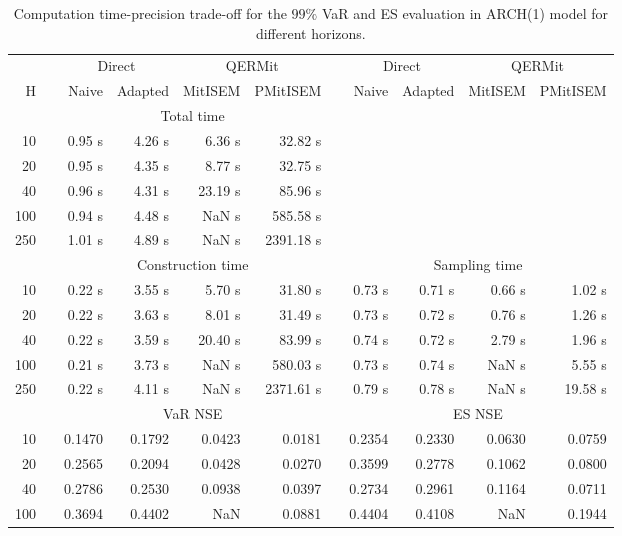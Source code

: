 { \renewcommand{\arraystretch}{1.3} 
\begin{table}[h] 
\centering 
\caption{Computation time-precision trade-off for the  $99\%$ VaR and ES evaluation in ARCH(1) model for different horizons.} 
\label{tab:time_precision_arch} 
\begin{tabular}{rr rrrr r rrrr}  
 & & \multicolumn{2}{c}{Direct} & \multicolumn{2}{c}{QERMit}&  & \multicolumn{2}{c}{Direct} & \multicolumn{2}{c}{QERMit} \\ \cline{3-6} \cline{8-11} 
 H & & Naive & Adapted & MitISEM & PMitISEM & & Naive & Adapted & MitISEM & PMitISEM \\ \hline 
 & & \multicolumn{4}{c}{Total time}  \\ \cline{3-6} 
10 & & 0.95 s & 4.26 s & 6.36 s & 32.82 s \\ 
20 & & 0.95 s & 4.35 s & 8.77 s & 32.75 s \\ 
40 & & 0.96 s & 4.31 s & 23.19 s & 85.96 s \\ 
100 & & 0.94 s & 4.48 s &  NaN s & 585.58 s \\ 
250 & & 1.01 s & 4.89 s &  NaN s & 2391.18 s \\ 
\hline 
 & & \multicolumn{4}{c}{Construction time} & & \multicolumn{4}{c}{ Sampling time} \\ \cline{3-6}  \cline{8-11}
10 & & 0.22 s & 3.55 s & 5.70 s & 31.80 s && 0.73 s & 0.71 s & 0.66 s & 1.02 s \\ 
20 & & 0.22 s & 3.63 s & 8.01 s & 31.49 s && 0.73 s & 0.72 s & 0.76 s & 1.26 s \\ 
40 & & 0.22 s & 3.59 s & 20.40 s & 83.99 s && 0.74 s & 0.72 s & 2.79 s & 1.96 s \\ 
100 & & 0.21 s & 3.73 s &  NaN s & 580.03 s && 0.73 s & 0.74 s &  NaN s & 5.55 s \\ 
250 & & 0.22 s & 4.11 s &  NaN s & 2371.61 s && 0.79 s & 0.78 s &  NaN s & 19.58 s \\ 
\hline 
 & & \multicolumn{4}{c}{VaR NSE} &&  \multicolumn{4}{c}{ES NSE} \\ \cline{3-6}  \cline{8-11}
10 && 0.1470  & 0.1792  & 0.0423 & 0.0181 && 0.2354  & 0.2330  & 0.0630 & 0.0759 \\ 
20 && 0.2565  & 0.2094  & 0.0428 & 0.0270 && 0.3599  & 0.2778  & 0.1062 & 0.0800 \\ 
40 && 0.2786  & 0.2530  & 0.0938 & 0.0397 && 0.2734  & 0.2961  & 0.1164 & 0.0711 \\ 
100 && 0.3694  & 0.4402  &    NaN & 0.0881 && 0.4404  & 0.4108  &    NaN & 0.1944 \\ 

\end{tabular}
\end{table}}

